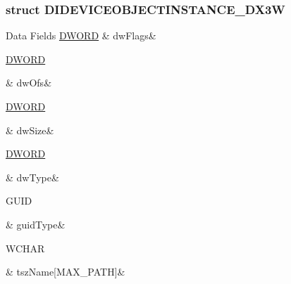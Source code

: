 \subsubsection{struct D\-I\-D\-E\-V\-I\-C\-E\-O\-B\-J\-E\-C\-T\-I\-N\-S\-T\-A\-N\-C\-E\-\_\-\-D\-X3\-W}
\begin{DoxyFields}{Data Fields}
\hypertarget{a00003_a4d2f405b1141000eb2af256e0fc8b98b}{\hyperlink{a00003_a50e15ae51c87ae06ab29c8148cb5f36c}{D\-W\-O\-R\-D}}\label{a00003_a4d2f405b1141000eb2af256e0fc8b98b}
&
dw\-Flags&
\\
\hline

\hypertarget{a00003_a2f0da10f0bff2a910138cc1b5715cdd5}{\hyperlink{a00003_a50e15ae51c87ae06ab29c8148cb5f36c}{D\-W\-O\-R\-D}}\label{a00003_a2f0da10f0bff2a910138cc1b5715cdd5}
&
dw\-Ofs&
\\
\hline

\hypertarget{a00003_a669c5a85f5a9eb97e64ad880fadaaa2d}{\hyperlink{a00003_a50e15ae51c87ae06ab29c8148cb5f36c}{D\-W\-O\-R\-D}}\label{a00003_a669c5a85f5a9eb97e64ad880fadaaa2d}
&
dw\-Size&
\\
\hline

\hypertarget{a00003_a81f5eff8d90c90eabc4c9a97d3ea7142}{\hyperlink{a00003_a50e15ae51c87ae06ab29c8148cb5f36c}{D\-W\-O\-R\-D}}\label{a00003_a81f5eff8d90c90eabc4c9a97d3ea7142}
&
dw\-Type&
\\
\hline

\hypertarget{a00003_aea5d3a608916b9ac856b773042e5051a}{G\-U\-I\-D}\label{a00003_aea5d3a608916b9ac856b773042e5051a}
&
guid\-Type&
\\
\hline

\hypertarget{a00003_a63701bade4cd23a8246a900ec69342c6}{W\-C\-H\-A\-R}\label{a00003_a63701bade4cd23a8246a900ec69342c6}
&
tsz\-Name\mbox{[}M\-A\-X\-\_\-\-P\-A\-T\-H\mbox{]}&
\\
\hline

\end{DoxyFields}
\label{da/dec/a00080}
\hypertarget{a00003_da/dec/a00080}{}
